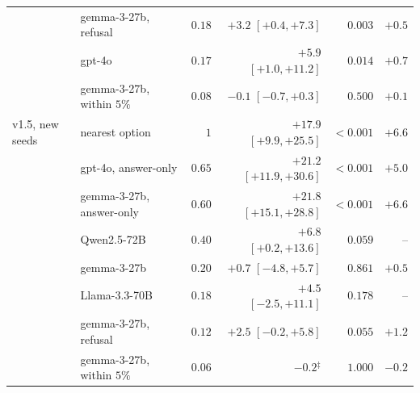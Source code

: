 \documentclass{article}
\begin{document}
\begin{table}[htbp]
\begin{tabular}{llrrrr}
 & gemma-3-27b, refusal & $0.18$ & $+3.2$ {\scriptsize$[+0.4,+7.3]$} & $0.003$ & $+0.5$\\
 & gpt-4o & $0.17$ & $+5.9$ {\scriptsize$[+1.0,+11.2]$} & $0.014$ & $+0.7$\\
 & gemma-3-27b, within $5\%$ & $0.08$ & $-0.1$ {\scriptsize$[-0.7,+0.3]$} & $0.500$ & $+0.1$\\
v1.5, new seeds & nearest option & $1$ & $+17.9$ {\scriptsize$[+9.9,+25.5]$} & $<0.001$ & $+6.6$\\
 & gpt-4o, answer-only & $0.65$ & $+21.2$ {\scriptsize$[+11.9,+30.6]$} & $<0.001$ & $+5.0$\\
 & gemma-3-27b, answer-only & $0.60$ & $+21.8$ {\scriptsize$[+15.1,+28.8]$} & $<0.001$ & $+6.6$\\
 & Qwen2.5-72B & $0.40$ & $+6.8$ {\scriptsize$[+0.2,+13.6]$} & $0.059$ & --\\
 & gemma-3-27b & $0.20$ & $+0.7$ {\scriptsize$[-4.8,+5.7]$} & $0.861$ & $+0.5$\\
 & Llama-3.3-70B & $0.18$ & $+4.5$ {\scriptsize$[-2.5,+11.1]$} & $0.178$ & --\\
 & gemma-3-27b, refusal & $0.12$ & $+2.5$ {\scriptsize$[-0.2,+5.8]$} & $0.055$ & $+1.2$\\
 & gemma-3-27b, within $5\%$ & $0.06$ & $-0.2$$^{\ddagger}$ & $1.000$ & $-0.2$\\
\bottomrule
\end{tabular}
\end{table}
\end{document}
